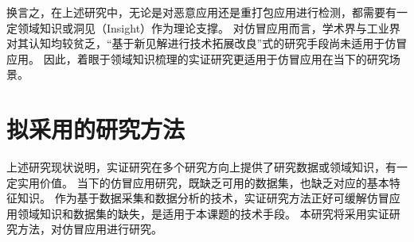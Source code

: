 换言之，在上述研究中，无论是对恶意应用还是重打包应用进行检测，都需要有一定领域知识或洞见（Insight）作为理论支撑。
对仿冒应用而言，学术界与工业界对其认知均较贫乏，``基于新见解进行技术拓展改良''式的研究手段尚未适用于仿冒应用。
因此，着眼于领域知识梳理的实证研究更适用于仿冒应用在当下的研究场景。
%
%
%

\section{拟采用的研究方法}
上述研究现状说明，实证研究在多个研究方向上提供了研究数据或领域知识，有一定实用价值。
当下的仿冒应用研究，既缺乏可用的数据集，也缺乏对应的基本特征知识。
作为基于数据采集和数据分析的技术，实证研究方法正好可缓解仿冒应用领域知识和数据集的缺失，是适用于本课题的技术手段。
本研究将采用实证研究方法，对仿冒应用进行研究。

